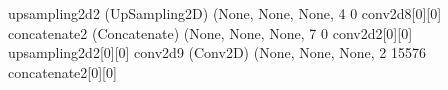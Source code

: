 \documentclass[letterpaper,10pt,english]{sphinxmanual}
\begin{document}
\begin{sphinxVerbatim}[commandchars=\\\{\}]
up\PYGZus{}sampling2d\PYGZus{}2 (UpSampling2D)  (None, None, None, 4 0           conv2d\PYGZus{}8[0][0]                   
\PYGZus{}\PYGZus{}\PYGZus{}\PYGZus{}\PYGZus{}\PYGZus{}\PYGZus{}\PYGZus{}\PYGZus{}\PYGZus{}\PYGZus{}\PYGZus{}\PYGZus{}\PYGZus{}\PYGZus{}\PYGZus{}\PYGZus{}\PYGZus{}\PYGZus{}\PYGZus{}\PYGZus{}\PYGZus{}\PYGZus{}\PYGZus{}\PYGZus{}\PYGZus{}\PYGZus{}\PYGZus{}\PYGZus{}\PYGZus{}\PYGZus{}\PYGZus{}\PYGZus{}\PYGZus{}\PYGZus{}\PYGZus{}\PYGZus{}\PYGZus{}\PYGZus{}\PYGZus{}\PYGZus{}\PYGZus{}\PYGZus{}\PYGZus{}\PYGZus{}\PYGZus{}\PYGZus{}\PYGZus{}\PYGZus{}\PYGZus{}\PYGZus{}\PYGZus{}\PYGZus{}\PYGZus{}\PYGZus{}\PYGZus{}\PYGZus{}\PYGZus{}\PYGZus{}\PYGZus{}\PYGZus{}\PYGZus{}\PYGZus{}\PYGZus{}\PYGZus{}\PYGZus{}\PYGZus{}\PYGZus{}\PYGZus{}\PYGZus{}\PYGZus{}\PYGZus{}\PYGZus{}\PYGZus{}\PYGZus{}\PYGZus{}\PYGZus{}\PYGZus{}\PYGZus{}\PYGZus{}\PYGZus{}\PYGZus{}\PYGZus{}\PYGZus{}\PYGZus{}\PYGZus{}\PYGZus{}\PYGZus{}\PYGZus{}\PYGZus{}\PYGZus{}\PYGZus{}\PYGZus{}\PYGZus{}\PYGZus{}\PYGZus{}\PYGZus{}\PYGZus{}
concatenate\PYGZus{}2 (Concatenate)     (None, None, None, 7 0           conv2d\PYGZus{}2[0][0]                   
                                                                 up\PYGZus{}sampling2d\PYGZus{}2[0][0]            
\PYGZus{}\PYGZus{}\PYGZus{}\PYGZus{}\PYGZus{}\PYGZus{}\PYGZus{}\PYGZus{}\PYGZus{}\PYGZus{}\PYGZus{}\PYGZus{}\PYGZus{}\PYGZus{}\PYGZus{}\PYGZus{}\PYGZus{}\PYGZus{}\PYGZus{}\PYGZus{}\PYGZus{}\PYGZus{}\PYGZus{}\PYGZus{}\PYGZus{}\PYGZus{}\PYGZus{}\PYGZus{}\PYGZus{}\PYGZus{}\PYGZus{}\PYGZus{}\PYGZus{}\PYGZus{}\PYGZus{}\PYGZus{}\PYGZus{}\PYGZus{}\PYGZus{}\PYGZus{}\PYGZus{}\PYGZus{}\PYGZus{}\PYGZus{}\PYGZus{}\PYGZus{}\PYGZus{}\PYGZus{}\PYGZus{}\PYGZus{}\PYGZus{}\PYGZus{}\PYGZus{}\PYGZus{}\PYGZus{}\PYGZus{}\PYGZus{}\PYGZus{}\PYGZus{}\PYGZus{}\PYGZus{}\PYGZus{}\PYGZus{}\PYGZus{}\PYGZus{}\PYGZus{}\PYGZus{}\PYGZus{}\PYGZus{}\PYGZus{}\PYGZus{}\PYGZus{}\PYGZus{}\PYGZus{}\PYGZus{}\PYGZus{}\PYGZus{}\PYGZus{}\PYGZus{}\PYGZus{}\PYGZus{}\PYGZus{}\PYGZus{}\PYGZus{}\PYGZus{}\PYGZus{}\PYGZus{}\PYGZus{}\PYGZus{}\PYGZus{}\PYGZus{}\PYGZus{}\PYGZus{}\PYGZus{}\PYGZus{}\PYGZus{}\PYGZus{}\PYGZus{}
conv2d\PYGZus{}9 (Conv2D)               (None, None, None, 2 15576       concatenate\PYGZus{}2[0][0]              
\PYGZus{}\PYGZus{}\PYGZus{}\PYGZus{}\PYGZus{}\PYGZus{}\PYGZus{}\PYGZus{}\PYGZus{}\PYGZus{}\PYGZus{}\PYGZus{}\PYGZus{}\PYGZus{}\PYGZus{}\PYGZus{}\PYGZus{}\PYGZus{}\PYGZus{}\PYGZus{}\PYGZus{}\PYGZus{}\PYGZus{}\PYGZus{}\PYGZus{}\PYGZus{}\PYGZus{}\PYGZus{}\PYGZus{}\PYGZus{}\PYGZus{}\PYGZus{}\PYGZus{}\PYGZus{}\PYGZus{}\PYGZus{}\PYGZus{}\PYGZus{}\PYGZus{}\PYGZus{}\PYGZus{}\PYGZus{}\PYGZus{}\PYGZus{}\PYGZus{}\PYGZus{}\PYGZus{}\PYGZus{}\PYGZus{}\PYGZus{}\PYGZus{}\PYGZus{}\PYGZus{}\PYGZus{}\PYGZus{}\PYGZus{}\PYGZus{}\PYGZus{}\PYGZus{}\PYGZus{}\PYGZus{}\PYGZus{}\PYGZus{}\PYGZus{}\PYGZus{}\PYGZus{}\PYGZus{}\PYGZus{}\PYGZus{}\PYGZus{}\PYGZus{}\PYGZus{}\PYGZus{}\PYGZus{}\PYGZus{}\PYGZus{}\PYGZus{}\PYGZus{}\PYGZus{}\PYGZus{}\PYGZus{}\PYGZus{}\PYGZus{}\PYGZus{}\PYGZus{}\PYGZus{}\PYGZus{}\PYGZus{}\PYGZus{}\PYGZus{}\PYGZus{}\PYGZus{}\PYGZus{}\PYGZus{}\PYGZus{}\PYGZus{}\PYGZus{}\PYGZus{}

\end{sphinxVerbatim}
\end{document}
